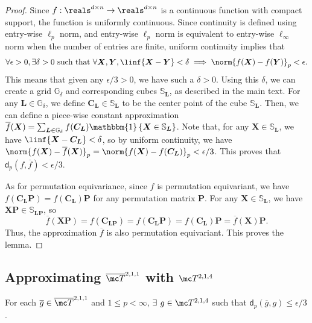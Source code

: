 \documentclass{article} %
\def\mC{{\bm{C}}}
\def\mL{{\bm{L}}}
\def\mP{{\bm{P}}}
\def\mX{{\bm{X}}}
\def\mY{{\bm{Y}}}
\def\sG{{\mathbb{G}}}
\def\sS{{\mathbb{S}}}
\newcommand{\funcdist}{\mathsf{d}}
\renewcommand{\indic}[1]{\mathbbm{1}\left\{#1\right\}}
\begin{document}
\begin{proof}
Since $f: \reals^{d \times n} \to \reals^{d \times n}$ is a continuous function with compact support, the function is uniformly continuous. Since continuity is defined using entry-wise $\ell_p$ norm, and entry-wise $\ell_p$ norm is equivalent to entry-wise $\ell_\infty$ norm when the number of entries are finite, uniform continuity implies that
\begin{equation*}
    \forall \epsilon > 0, \exists \delta > 0 \text { such that } \forall \mX, \mY, \linf{\mX-\mY} < \delta \implies \norm{f(\mX)-f(\mY)}_p < \epsilon.
\end{equation*}
This means that given any $\epsilon/3>0$, we have such a $\delta>0$. Using this $\delta$, we can create a grid $\sG_{\delta}$ and corresponding cubes $\sS_\mL$, as described in the main text.
For any $\mL \in \sG_{\delta}$, we define $\mC_\mL \in \sS_\mL$ to be the center point of the cube $\sS_\mL$. Then, we can define a piece-wise constant approximation $\overline f(\mX) = \sum\nolimits_{\mL \in \sG_{\delta}} f(\mC_\mL) \indic{\mX \in \sS_\mL}$.
Note that, for any $\mX \in \sS_\mL$, we have $\linf{\mX - \mC_\mL} < \delta$, so by uniform continuity, we have $\norm{f(\mX) - \overline f(\mX)}_p = \norm{f(\mX) - f(\mC_\mL)}_p< \epsilon / 3$. 
This proves that $\funcdist_p(f, \overline f) < \epsilon/3$.

As for permutation equivariance, since $f$ is permutation equivariant, we have $f(\mC_\mL \mP) = f(\mC_\mL)\mP$ for any permutation matrix $\mP$. For any $\mX \in \sS_\mL$, we have $\mX \mP \in \sS_{\mL \mP}$, so
\begin{equation*}
    \overline f(\mX \mP)
    = f(\mC_{\mL \mP}) = f(\mC_\mL \mP) = f(\mC_\mL) \mP = \overline f(\mX) \mP.
\end{equation*}
Thus, the approximation $\overline f$ is also permutation equivariant. This proves the lemma.
\end{proof}

\subsection{Approximating $\overline{\mc T}^{2,1,1}$ with $\mc T^{2,1,4}$}
\label{appen:thm2-part3}

\begin{lemma}
\label{lemma:part3}
For each $\overline g \in \overline {\mc T}^{2,1,1}$ and $1 \leq p < \infty$, $\exists$ $g \in \mc T^{2,1,4}$ such that $\funcdist_p(\overline g,g) \leq \epsilon/3$.
\end{lemma}
\end{document}
